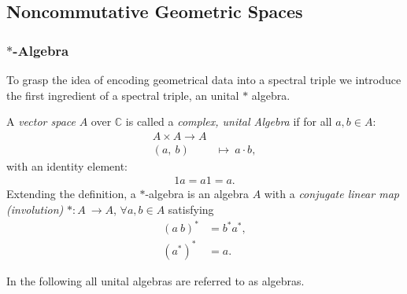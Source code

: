 \subsection{Noncommutative Geometric Spaces\label{sec:1}}
\subsubsection{$*$-Algebra}
To grasp the idea of encoding geometrical data into a spectral triple we
introduce the first ingredient of a spectral triple, an unital $*$ algebra.
\begin{mydefinition}
    A \textit{vector space} $A$ over $\mathbb{C}$ is called a
    \textit{complex, unital Algebra} if for all $a,b \in A$:
            \begin{align}
            A \times A \rightarrow A\\
            (a,\ b)\ &\mapsto \ a\cdot b,
            \end{align}
    with an identity element:
            \begin{align}
            1a = a1 =a.
            \end{align}
    Extending the definition, a $*$-algebra is an algebra $A$ with a \textit{conjugate linear map (involution)} $*:A\ \rightarrow  A$,
    $\forall a, b \in A$ satisfying
    \begin{align}
        (a\ b)^* &= b^*a^*,\\
        (a^*)^* &= a.
    \end{align}
\end{mydefinition}
In the following all unital algebras are referred to as algebras.

